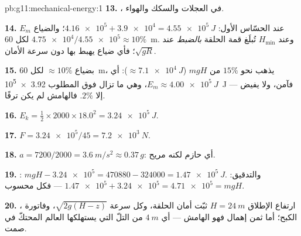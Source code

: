 \begin{solution}{pb:g11:mechanical-energy:1}
\textbf{13.} ، في العجلات والسكك والهواء.

\textbf{14.} $E_m$ عند الحسّاس الأول: $\num{4.16e5} + \num{3.9e4} =
\qty{4.55e5}{J}$؛ والضياع $\num{4.75e4}/\num{4.55e5} \approx 10\%$ لكل
\qty{60}{m}. وعند $H_{\min}$ تُبلَغ قمة الحلقة \emph{بالضبط}
عند $\sqrt{gR}$؛ فأي ضياع يهبط بها دون سرعة الأمان.

\textbf{15.} بضياع $\approx 10\%$ لكل \qty{60}{m}، يذهب نحو $15\%$ من
$mgH$ ($\approx \qty{7.1e4}{J}$): أي $E_m \approx \qty{4.00e5}{J}$،
وهي ما تزال فوق المطلوب \qty{3.92e5}{J} --- فآمن، ولا يفيض إلا $2\%$.
فالهامش لم يكن ترفًا.

\textbf{16.} $E_k = \tfrac12 \times 2000 \times 18.0^2 =
\qty{3.24e5}{J}$.

\textbf{17.} $F = \num{3.24e5}/45 = \qty{7.2e3}{N}$.

\textbf{18.} $a = 7200/2000 = \qty{3.6}{m/s^2} \approx 0.37\,g$:
أي حازم لكنه مريح.

\textbf{19.}  : $mgH - \num{3.24e5} = \num{470880} -
\num{324000} = \qty{1.47e5}{J}$. والتدقيق: $\num{1.47e5} + \num{3.24e5} =
\num{4.71e5} = mgH$ --- فكل  محسوب.

\textbf{20.} ارتفاع الإطلاق $H = \qty{24}{m}$ ثبّت أمان
الحلقة، وكل سرعة $\sqrt{2g(H - z)}$، وفاتورة ، 
الكبح؛ أما ثمن إهمال  فهو الهامش --- أي $\qty{4}{m}$
من التلّ التي يستهلكها العالم المحتكّ في صمت.
\end{solution}
